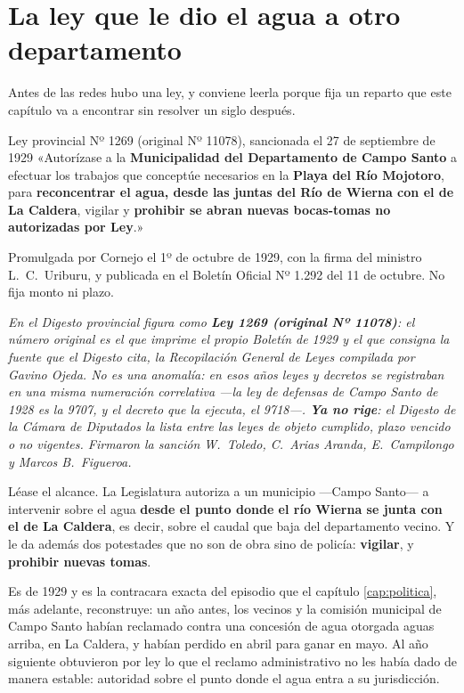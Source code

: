 \section{La ley que le dio el agua a otro departamento}

Antes de las redes hubo una ley, y conviene leerla porque fija un reparto que este capítulo
va a encontrar sin resolver un siglo después.

\begin{ficha}{Ley provincial Nº 1269 (original Nº 11078), sancionada el 27 de septiembre de 1929}
«Autorízase a la \textbf{Municipalidad del Departamento de Campo Santo} a efectuar los
trabajos que conceptúe necesarios en la \textbf{Playa del Río Mojotoro}, para
\textbf{reconcentrar el agua, desde las juntas del Río de Wierna con el de La Caldera},
vigilar y \textbf{prohibir se abran nuevas bocas-tomas no autorizadas por Ley}.»

Promulgada por Cornejo el 1º de octubre de 1929, con la firma del ministro L.\ C.\ Uriburu, y publicada en el Boletín Oficial Nº 1.292 del 11 de octubre. No fija monto ni plazo.\par\textit{En el Digesto provincial figura como \textbf{Ley 1269 (original Nº 11078)}: el número original es el que imprime el propio Boletín de 1929 y el que consigna la fuente que el Digesto cita, la \textit{Recopilación General de Leyes} compilada por Gavino Ojeda. No es una anomalía: en esos años leyes y decretos se registraban en una misma numeración correlativa ---la ley de defensas de Campo Santo de 1928 es la 9707, y el decreto que la ejecuta, el 9718---. \textbf{Ya no rige}: el Digesto de la Cámara de Diputados la lista entre las leyes de objeto cumplido, plazo vencido o no vigentes. Firmaron la sanción W.\ Toledo, C.\ Arias Aranda, E.\ Campilongo y Marcos B.\ Figueroa.}
\end{ficha}

Léase el alcance. La Legislatura autoriza a un municipio —Campo Santo— a intervenir sobre
el agua \textbf{desde el punto donde el río Wierna se junta con el de La Caldera}, es
decir, sobre el caudal que baja del departamento vecino. Y le da además dos potestades que
no son de obra sino de policía: \textbf{vigilar}, y \textbf{prohibir nuevas tomas}.

Es de 1929 y es la contracara exacta del episodio que el capítulo \ref{cap:politica}, más adelante, reconstruye: un año
antes, los vecinos y la comisión municipal de Campo Santo habían reclamado contra una
concesión de agua otorgada aguas arriba, en La Caldera, y habían perdido en abril para
ganar en mayo. Al año siguiente obtuvieron por ley lo que el reclamo administrativo no les
había dado de manera estable: autoridad sobre el punto donde el agua entra a su
jurisdicción.

